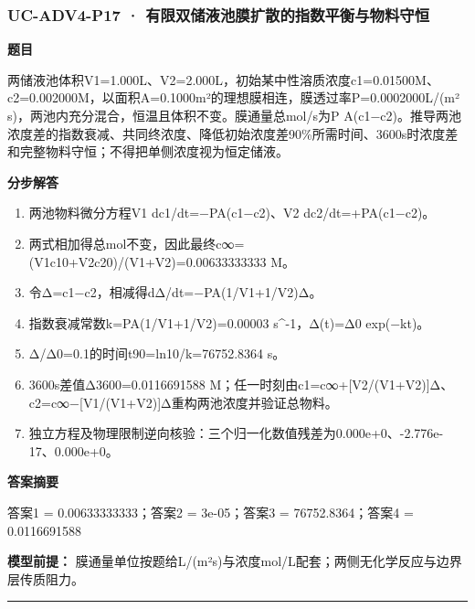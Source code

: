 \documentclass[UTF8,11pt,a4paper]{ctexart}
\begin{document}
\subsubsection*{UC-ADV4-P17 · 有限双储液池膜扩散的指数平衡与物料守恒}
\noindent\textbf{题目}\par
两储液池体积V1=1.000L、V2=2.000L，初始某中性溶质浓度c1=0.01500M、c2=0.002000M，以面积A=0.1000m²的理想膜相连，膜透过率P=0.0002000L/(m² s)，两池内充分混合，恒温且体积不变。膜通量总mol/s为P A(c1−c2)。推导两池浓度差的指数衰减、共同终浓度、降低初始浓度差90\%所需时间、3600s时浓度差和完整物料守恒；不得把单侧浓度视为恒定储液。\par
\medskip\noindent\textbf{分步解答}
\begin{enumerate}
\item 两池物料微分方程V1 dc1/dt=−PA(c1−c2)、V2 dc2/dt=+PA(c1−c2)。
\item 两式相加得总mol不变，因此最终c∞=(V1c10+V2c20)/(V1+V2)=0.00633333333 M。
\item 令Δ=c1−c2，相减得dΔ/dt=−PA(1/V1+1/V2)Δ。
\item 指数衰减常数k=PA(1/V1+1/V2)=0.00003 s\textasciicircum{}-1，Δ(t)=Δ0 exp(−kt)。
\item Δ/Δ0=0.1的时间t90=ln10/k=76752.8364 s。
\item 3600s差值Δ3600=0.0116691588 M；任一时刻由c1=c∞+[V2/(V1+V2)]Δ、c2=c∞−[V1/(V1+V2)]Δ重构两池浓度并验证总物料。
\item 独立方程及物理限制逆向核验：三个归一化数值残差为0.000e+0、-2.776e-17、0.000e+0。
\end{enumerate}
\noindent\textbf{答案摘要}\par
答案1 = 0.00633333333；答案2 = 3e-05；答案3 = 76752.8364；答案4 = 0.0116691588\par
\noindent\textbf{模型前提：}
膜通量单位按题给L/(m²s)与浓度mol/L配套；两侧无化学反应与边界层传质阻力。\par
\medskip\hrule\medskip
{}
\end{document}
